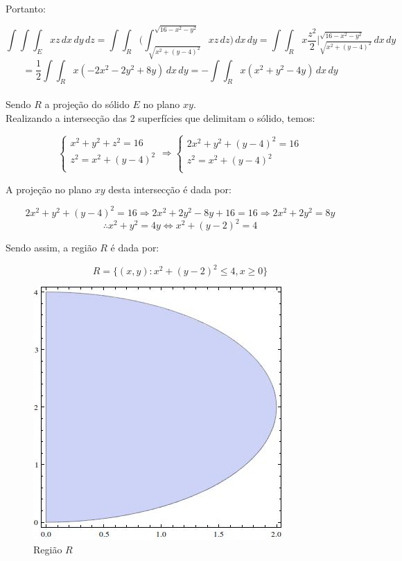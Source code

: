 \documentclass[12pt,a4paper]{article}
\begin{document}
Portanto:

$$ \int \int \int_E xz \,dx \,dy \,dz =  \int \int_R \Big( \int_{ \sqrt{x^2 + (y-4)^2} }^{ \sqrt{16 - x^2 - y^2} } xz \,dz \Big) \,dx \,dy = \int \int_R x \frac{z^2}{2} \Big|_{ \sqrt{x^2 + (y-4)^2} }^{ \sqrt{16 - x^2 - y^2} } \,dx \,dy  $$
$$ = \frac{1}{2} \int \int_R x (-2x^2 - 2y^2 + 8y) \,dx \,dy = - \int \int_R x (x^2 + y^2 - 4y) \,dx \,dy $$ \\

Sendo $R$ a projeção do sólido $E$ no plano $xy$. \\

Realizando a intersecção das 2 superfícies que delimitam o sólido, temos:

$$
\left\{
\begin{array}{lc}
x^2 + y^2 + z^2 = 16\\
z^2 = x^2 + (y-4)^2 \\
\end{array}
\right. \Rightarrow
\left\{
\begin{array}{lc}
2x^2 + y^2 + (y-4)^2 = 16\\
z^2 = x^2 + (y-4)^2 \\
\end{array}
\right.
$$

A projeção no plano $xy$ desta intersecção é dada por:

$$ 2x^2 + y^2 + (y-4)^2 = 16 \Rightarrow 2x^2 + 2y^2 -8y + 16 = 16 \Rightarrow 2x^2 + 2y^2 = 8y $$
$$   \therefore x^2 + y^2 = 4y \Leftrightarrow x^2 + (y-2)^2 = 4 $$

Sendo assim, a região $R$ é dada por:

$$ R = \{ (x,y): x^2 + (y-2)^2  \leq 4 , x \geq 0 \} $$

\begin{figure}[h!]
	\centering
	\includegraphics[scale=0.5]{Q2bB.jpg}  
	\caption{Região $R$}
	\label{fig:figura11}
\end{figure}
\end{document}
